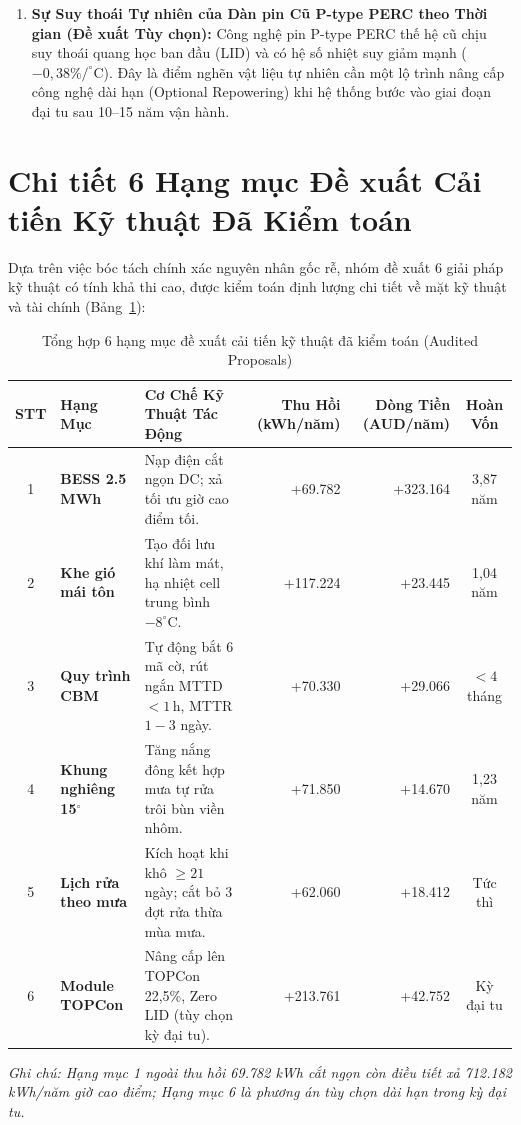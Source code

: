 \documentclass[12pt, a4paper]{report}
\begin{document}
\begin{enumerate}[label=\arabic*., leftmargin=*]
    \item \textbf{Sự Suy thoái Tự nhiên của Dàn pin Cũ P-type PERC theo Thời gian (Đề xuất Tùy chọn):} 
    Công nghệ pin P-type PERC thế hệ cũ chịu suy thoái quang học ban đầu (LID) và có hệ số nhiệt suy giảm mạnh ($-0{,}38\%/^\circ\text{C}$). Đây là điểm nghẽn vật liệu tự nhiên cần một lộ trình nâng cấp công nghệ dài hạn (Optional Repowering) khi hệ thống bước vào giai đoạn đại tu sau 10--15 năm vận hành.
\end{enumerate}

\section{Chi tiết 6 Hạng mục Đề xuất Cải tiến Kỹ thuật Đã Kiểm toán}
\label{sec:audited_proposals}

Dựa trên việc bóc tách chính xác nguyên nhân gốc rễ, nhóm đề xuất 6 giải pháp kỹ thuật có tính khả thi cao, được kiểm toán định lượng chi tiết về mặt kỹ thuật và tài chính (Bảng~\ref{tab:six_proposals_summary}):

\begin{table}[H]
\centering
\caption{Tổng hợp 6 hạng mục đề xuất cải tiến kỹ thuật đã kiểm toán (Audited Proposals)}
\label{tab:six_proposals_summary}
\small
\renewcommand{\arraystretch}{1.22}
\begin{tabularx}{\textwidth}{@{} c >{\bfseries}l X r r c @{}}
\toprule
\textbf{STT} & \textbf{Hạng Mục} & \textbf{Cơ Chế Kỹ Thuật Tác Động} & \textbf{Thu Hồi} \newline \scriptsize (kWh/năm) & \textbf{Dòng Tiền} \newline \scriptsize (AUD/năm) & \textbf{Hoàn Vốn} \\
\midrule
1 & BESS 2.5 MWh & Nạp điện cắt ngọn DC; xả tối ưu giờ cao điểm tối. & +69.782 & +323.164 & 3,87 năm \\
2 & Khe gió mái tôn & Tạo đối lưu khí làm mát, hạ nhiệt cell trung bình $-8^\circ\text{C}$. & +117.224 & +23.445 & 1,04 năm \\
3 & Quy trình CBM & Tự động bắt 6 mã cờ, rút ngắn MTTD $<1\,\text{h}$, MTTR $1-3$ ngày. & +70.330 & +29.066 & $< 4$ tháng \\
4 & Khung nghiêng 15$^\circ$ & Tăng nắng đông kết hợp mưa tự rửa trôi bùn viền nhôm. & +71.850 & +14.670 & 1,23 năm \\
5 & Lịch rửa theo mưa & Kích hoạt khi khô $\ge 21$ ngày; cắt bỏ 3 đợt rửa thừa mùa mưa. & +62.060 & +18.412 & Tức thì \\
6 & Module TOPCon & Nâng cấp lên TOPCon 22,5\%, Zero LID (tùy chọn kỳ đại tu). & +213.761 & +42.752 & Kỳ đại tu \\
\bottomrule
\end{tabularx}
\vspace{2pt}
\begin{flushleft}
\scriptsize \textit{Ghi chú: Hạng mục 1 ngoài thu hồi 69.782 kWh cắt ngọn còn điều tiết xả 712.182 kWh/năm giờ cao điểm; Hạng mục 6 là phương án tùy chọn dài hạn trong kỳ đại tu.}
\end{flushleft}
\end{table}
\end{document}
